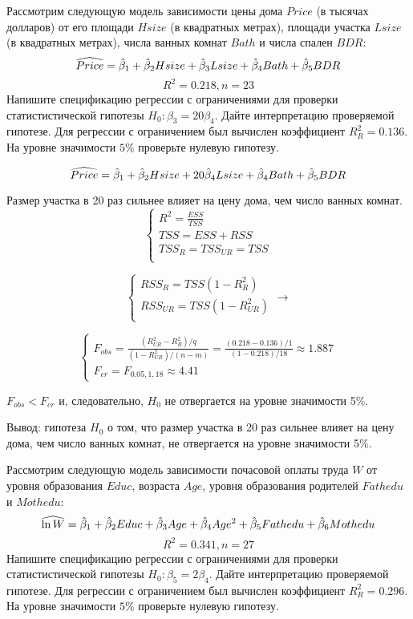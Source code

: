 \begin{problem}
Рассмотрим следующую модель зависимости цены дома $Price$ (в тысячах долларов) от его площади $Hsize$ (в квадратных метрах), площади участка $Lsize$ (в квадратных метрах), числа ванных комнат $Bath$ и числа спален $BDR$:
\[
\widehat{Price} = \hat{\beta}_1 + \hat{\beta}_2 Hsize + \hat{\beta}_3 Lsize + \hat{\beta}_4 Bath + \hat{\beta}_5 BDR
\]
\[
R^2 = 0.218, n = 23
\]
Напишите спецификацию регрессии с ограничениями для проверки статистистической гипотезы $H_0: \beta_3 = 20\beta_4$. Дайте интерпретацию проверяемой гипотезе. Для регрессии с ограничением был вычислен коэффициент $R_{R}^2 = 0.136$. На уровне значимости $5\%$ проверьте нулевую гипотезу.


\begin{sol}
\[
\widehat{Price}= \hat{\beta}_1+\hat{\beta}_2 Hsize+20\hat{\beta}_4 Lsize+\hat{\beta}_4 Bath + \hat{\beta}_5 BDR
\]

Размер участка в 20 раз сильнее влияет на цену дома, чем число ванных комнат.
\[
\begin{cases}
R^2=\frac{ESS}{TSS}\\
TSS=ESS+RSS\\
TSS_R=TSS_{UR}=TSS\\
\end{cases}
\]

\[
\begin{cases}
RSS_{R}=TSS(1-R^2_{R})\\
RSS_{UR}=TSS(1-R^2_{UR})\\
\end{cases} \to
\]

\[
\begin{cases}
F_{obs}=\frac{(R_{UR}^2-R_{R}^2)/q}{(1-R^2_{UR})/(n-m)}=\frac{(0.218-0.136)/1}{(1-0.218)/18}\approx 1.887\\
F_{cr}= F_{0.05,1,18}\approx 4.41
\end{cases}
\]

$F_{obs}<F_{cr}$ и, следовательно, $H_0$ не отвергается на уровне значимости 5\%.

Вывод: гипотеза $H_0$ о том, что размер участка в 20 раз сильнее влияет на цену дома, чем число ванных комнат, не отвергается на уровне значимости 5\%.
\end{sol}
\end{problem}



\begin{problem}
Рассмотрим следующую модель зависимости почасовой оплаты труда $W$ от уровня образования $Educ$, возраста $Age$, уровня образования родителей $Fathedu$ и $Mothedu$:
\[
\widehat{\ln W} = \hat{\beta}_1 + \hat{\beta}_2 Educ + \hat{\beta}_3 Age + \hat{\beta}_4 Age^2+ \hat{\beta}_5 Fathedu + \hat{\beta}_6 Mothedu
\]
\[
R^2 = 0.341, n = 27
\]
Напишите спецификацию регрессии с ограничениями для проверки статистистической гипотезы $H_0: \beta_5 = 2\beta_4$. Дайте интерпретацию проверяемой гипотезе. Для регрессии с ограничением был вычислен коэффициент $R_{R}^2 = 0.296$. На уровне значимости $5\%$ проверьте нулевую гипотезу.


\begin{sol}
\end{sol}
\end{problem}



